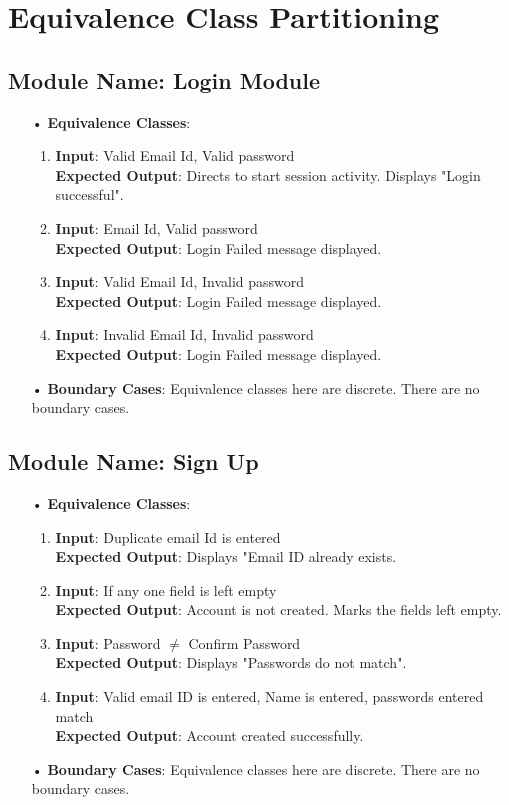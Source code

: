 \documentclass{scrreprt}
\begin{document}
\chapter{Equivalence Class Partitioning}
\section{Module Name: Login Module}
\begin{itemize}
\item[•]\textbf{Equivalence Classes}:
\begin{enumerate}
\item \textbf{Input}: Valid Email Id, Valid password\\
\textbf{Expected Output}: Directs to start session activity. Displays "Login successful".
\item \textbf{Input}: Email Id, Valid password\\
\textbf{Expected Output}: Login Failed message displayed.
\item \textbf{Input}: Valid Email Id, Invalid password\\
\textbf{Expected Output}: Login Failed message displayed.
\item \textbf{Input}: Invalid Email Id, Invalid password\\
\textbf{Expected Output}: Login Failed message displayed.
\end{enumerate}
\item[•]\textbf{Boundary Cases}: Equivalence classes here are discrete. There are no boundary cases.
\end{itemize}

\section{Module Name: Sign Up}
\begin{itemize}
\item[•]\textbf{Equivalence Classes}:
\begin{enumerate}
\item \textbf{Input}: Duplicate email Id is entered \\
\textbf{Expected Output}: Displays "Email ID already exists.
\item \textbf{Input}: If any one field is left empty\\
\textbf{Expected Output}: Account is not created. Marks the fields left empty.
\item \textbf{Input}: Password $\neq$ Confirm Password\\
\textbf{Expected Output}: Displays "Passwords do not match".
\item \textbf{Input}: Valid email ID is entered, Name is entered, passwords entered match\\
\textbf{Expected Output}: Account created successfully.
\end{enumerate}
\item[•]\textbf{Boundary Cases}: Equivalence classes here are discrete. There are no boundary cases.
\end{itemize}
\end{document}
